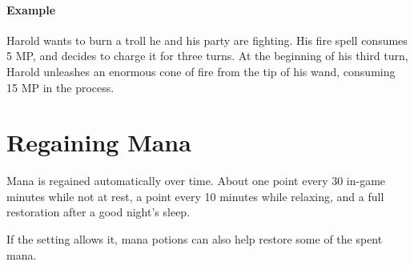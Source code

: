 \paragraph{Example} Harold wants to burn a troll he and his party are fighting.
His fire spell consumes 5 MP, and decides to charge it for three turns.
At the beginning of his third turn, Harold unleashes an enormous cone of fire from the tip of his wand, consuming 15 MP in the process.

\section{Regaining Mana}
Mana is regained automatically over time.
About one point every 30 in-game minutes while not at rest,
a point every 10 minutes while relaxing,
and a full restoration after a good night's sleep.

If the setting allows it, mana potions can also help restore some of the spent mana.
